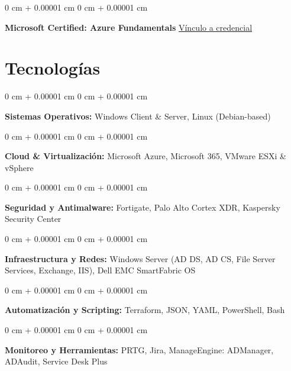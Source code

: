 \documentclass[10pt, letterpaper]{article}
\newenvironment{onecolentry}{
    \begin{adjustwidth}{
        0 cm + 0.00001 cm
    }{
        0 cm + 0.00001 cm
    }
}{
    \end{adjustwidth}
} %
\newenvironment{twocolentry}[2][]{
    \onecolentry
    \def\secondColumn{#2}
    \setcolumnwidth{\fill, 4.5 cm}
    \begin{paracol}{2}
}{
    \switchcolumn \raggedleft \secondColumn
    \end{paracol}
    \endonecolentry
} %
\begin{document}
        \vspace{0.10 cm}
        \vspace{0.2 cm}
        
        \begin{twocolentry}{
           \href{https://learn.microsoft.com/api/credentials/share/es-mx/WilliamsAlejandroMedinaMrquez-4454/BE7908B9DE57559E?sharingId=1928DA4A1627BB36}{Vínculo a credencial}
        }
            \textbf{Microsoft Certified: Azure Fundamentals}\end{twocolentry}

    
\section{Tecnologías}

\begin{onecolentry}
    \textbf{Sistemas Operativos:} Windows Client \& Server, Linux (Debian-based)
\end{onecolentry}

\vspace{0.2 cm}

\begin{onecolentry}
    \textbf{Cloud \& Virtualización:} Microsoft Azure, Microsoft 365, VMware ESXi \& vSphere
\end{onecolentry}

\vspace{0.2 cm}

\begin{onecolentry}
    \textbf{Seguridad y Antimalware:} Fortigate, Palo Alto Cortex XDR, Kaspersky Security Center
\end{onecolentry}

\vspace{0.2 cm}

\begin{onecolentry}
    \textbf{Infraestructura y Redes:} Windows Server (AD DS, AD CS, File Server Services, Exchange, IIS), Dell EMC SmartFabric OS
\end{onecolentry}

\vspace{0.2 cm}

\begin{onecolentry}
    \textbf{Automatización y Scripting:} Terraform, JSON, YAML, PowerShell, Bash
\end{onecolentry}

\vspace{0.2 cm}

\begin{onecolentry}
    \textbf{Monitoreo y Herramientas:} PRTG, Jira, ManageEngine: ADManager, ADAudit, Service Desk Plus
\end{onecolentry}
 
\end{document}
